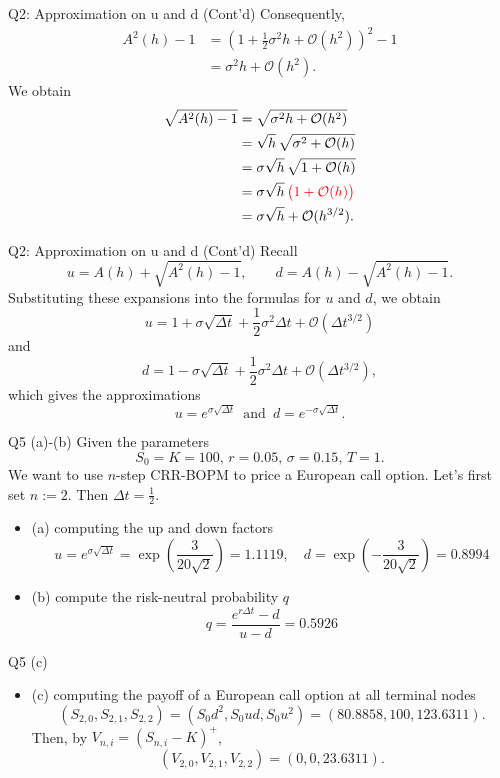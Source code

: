 \documentclass{beamer}
\begin{document}
\begin{frame}{Q2: Approximation on u and d (Cont'd)}
Consequently,
\[
\begin{aligned}
A^2(h)-1
&=
\left(1+\frac12\sigma^2h+\mathcal{O}(h^2)\right)^2-1\\
&=
\sigma^2h+\mathcal{O}(h^2).
\end{aligned}
\]
We obtain
\[
\begin{aligned}
\sqrt{A^2(h)-1}
&=
\sqrt{\sigma^2h+\mathcal{O}(h^2)}\\
&=
\sqrt{h}\,\sqrt{\sigma^2+\mathcal{O}(h)}\\
&=
\sigma\sqrt{h}\,\sqrt{1+\mathcal{O}(h)}\\
&=
\sigma\sqrt{h}\,\textcolor{red}{\big(1+\mathcal{O}(h)\big)}\\
&=
\sigma\sqrt{h}+\mathcal{O}(h^{3/2}).
\end{aligned}
\]
\end{frame}

\begin{frame}{Q2: Approximation on u and d (Cont'd)}
Recall
\[
u=A(h)+\sqrt{A^2(h)-1},
\qquad
d=A(h)-\sqrt{A^2(h)-1}.
\]
Substituting these expansions into the formulas for \(u\) and \(d\), we obtain
\[
\boxed{
u
=
1+\sigma\sqrt{\Delta t}
+\frac12\sigma^2\Delta t
+\mathcal{O}\left(\Delta t^{3/2}\right)
}
\]
and
\[
\boxed{
d
=
1-\sigma\sqrt{\Delta t}
+\frac12\sigma^2\Delta t
+\mathcal{O}\left(\Delta t^{3/2}\right),
}
\]
which gives the approximations
\[
\boxed{
u = e^{\sigma \sqrt{\Delta t}} \,\text{ and }\,d=e^{-\sigma \sqrt{\Delta t}}.}
\]
\end{frame}

\begin{frame}{Q5 (a)-(b)}
Given the parameters
\[
S_0=K = 100, \,r=0.05, \, \sigma=0.15, \,T=1.
\]
We want to use $n$-step CRR-BOPM to price a European call option. Let's first set $n:=2$. Then $\Delta t = \frac{1}{2}$.
\begin{itemize}
    \item (a) computing the up and down factors
    \[
    u = e^{\sigma \sqrt{\Delta t} } = \exp({\frac{3}{20\sqrt{2}}})=1.1119, \quad d=\exp({-\frac{3}{20\sqrt{2}}})=0.8994
    \]
    \item (b) compute the risk-neutral probability $q$
    \[
    q = \frac{e^{r\Delta t} - d}{u - d} = 0.5926
    \]
\end{itemize}
\end{frame}

\begin{frame}{Q5 (c)}
     \begin{itemize}
        \item (c) computing the payoff of a European call option at all terminal nodes
        \[
        (S_{2, 0}, S_{2, 1}, S_{2, 2}) = (S_0d^2, S_0 ud, S_0 u^2)= (80.8858, 100, 123.6311).
        \]
        Then, by $V_{n, i} = (S_{n, i}-K)^+$,
        \[
        (V_{2, 0}, V_{2, 1}, V_{2, 2}) = (0, 0, 23.6311).
        \]
    \end{itemize}
\end{frame}
\end{document}
